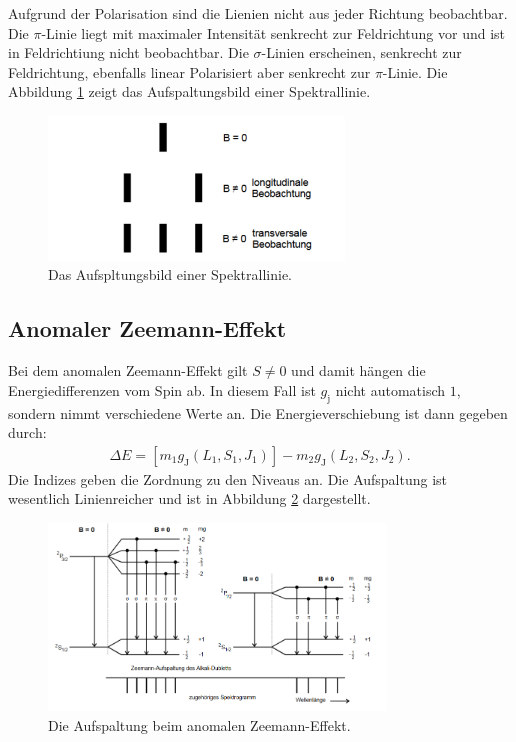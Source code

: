 Aufgrund der Polarisation sind die Lienien nicht aus jeder Richtung beobachtbar.
Die $\pi$-Linie liegt mit maximaler Intensität senkrecht zur Feldrichtung vor und ist in Feldrichtiung nicht beobachtbar.
Die $\sigma$-Linien erscheinen, senkrecht zur Feldrichtung, ebenfalls linear Polarisiert aber senkrecht zur $\pi$-Linie.
Die Abbildung \ref{fig:aufspaltungsbild} zeigt das Aufspaltungsbild einer Spektrallinie.
\begin{figure}
   \centering
    \includegraphics[width=0.7\textwidth]{aufspaltungsbild.PNG}
    \caption{Das Aufspltungsbild einer Spektrallinie.\cite{skript}}
    \label{fig:aufspaltungsbild}
\end{figure}
\subsection{Anomaler Zeemann-Effekt}
Bei dem anomalen Zeemann-Effekt gilt $S \neq 0$ und damit hängen die Energiedifferenzen vom Spin ab.
In diesem Fall ist $g_\mathrm{j}$ nicht automatisch $1$, sondern nimmt verschiedene Werte an.
Die Energieverschiebung ist dann gegeben durch:
\begin{align}
  \Delta E= [m_\mathrm{1}g_\mathrm{J}(L_\mathrm{1},S_\mathrm{1},J_\mathrm{1})]-m_\mathrm{2}g_\mathrm{J}(L_\mathrm{2},S_\mathrm{2},J_\mathrm{2}). \label{eqn:g_ji}
\end{align}
Die Indizes geben die Zordnung zu den Niveaus an.
Die Aufspaltung ist wesentlich Linienreicher und ist in Abbildung \ref{fig:anomal} dargestellt.
\begin{figure}
   \centering
    \includegraphics[width=0.8\textwidth]{anomal.PNG}
    \caption{Die Aufspaltung beim anomalen Zeemann-Effekt.\cite{skript}}
    \label{fig:anomal}
\end{figure}
